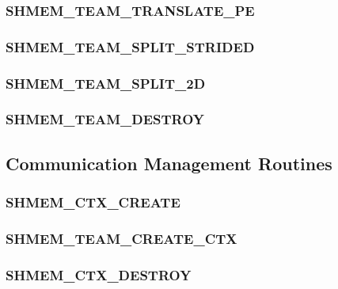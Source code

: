 \documentclass[10pt,oneside]{book}
\begin{document}
\subsubsection{\textbf{SHMEM\_TEAM\_TRANSLATE\_PE}}\label{subsec:shmem_team_translate_pe}


\subsubsection{\textbf{SHMEM\_TEAM\_SPLIT\_STRIDED}}\label{subsec:shmem_team_split_strided}


\subsubsection{\textbf{SHMEM\_TEAM\_SPLIT\_2D}}\label{subsec:shmem_team_split_2d}


\subsubsection{\textbf{SHMEM\_TEAM\_DESTROY}}\label{subsec:shmem_team_destroy}




\subsection{Communication Management Routines}\label{sec:ctx}


\subsubsection{\textbf{SHMEM\_CTX\_CREATE}}
\label{subsec:shmem_ctx_create}


\subsubsection{\textbf{SHMEM\_TEAM\_CREATE\_CTX}}
\label{subsec:shmem_team_create_ctx}


\subsubsection{\textbf{SHMEM\_CTX\_DESTROY}}
\label{subsec:shmem_ctx_destroy}

\end{document}
